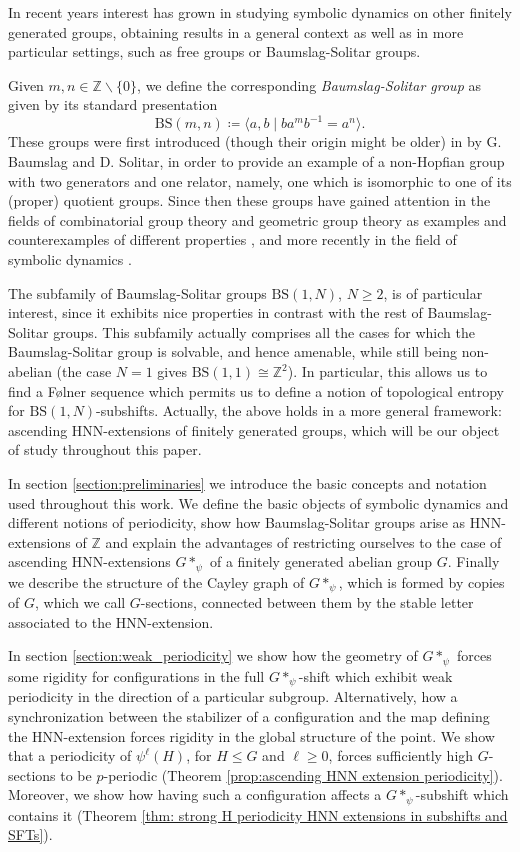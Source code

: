 \documentclass[letterpaper,11pt,reqno]{amsart}
\theoremstyle{plain}
\theoremstyle{definition}
\theoremstyle{cupremark}
\newcommand{\BS}[1][N]{\mathrm{BS}(1,#1)}
\begin{document}
In recent years interest has grown in studying symbolic dynamics on other finitely generated groups, obtaining results in a general context as well as in more particular settings, such as free groups or Baumslag-Solitar groups.

Given $m,n\in \mathbb{Z}\backslash \{0\}$, we define the corresponding \textit{Baumslag-Solitar group} as given by its standard presentation
$$
\mathrm{BS}(m,n)\coloneqq \langle a,b \mid ba^mb^{-1}=a^n \rangle.
$$
These groups were first introduced (though their origin might be older) in \cite{baumslag_solitar_1962} by G. Baumslag and D. Solitar, in order to provide an example of a non-Hopfian group with two generators and one relator, namely, one which is isomorphic to one of its (proper) quotient groups. Since then these groups have gained attention in the fields of combinatorial group theory and geometric group theory as examples and counterexamples of different properties \cite{harpe_2003,meskin_1972}, and more recently in the field of symbolic dynamics \cite{aubrun_kari_2013,cyr2016distortion,esnay2020weakly}.

The subfamily of Baumslag-Solitar groups $\BS$, $N\ge 2$, is of particular interest, since it exhibits nice properties in contrast with the rest of Baumslag-Solitar groups. This subfamily actually comprises all the cases for which the Baumslag-Solitar group is solvable, and hence amenable, while still being non-abelian (the case $N=1$ gives $\mathrm{BS}(1,1)\cong \mathbb{Z}^2$). In particular, this allows us to find a F\o lner sequence which permits us to define a notion of topological entropy for $\BS$-subshifts. Actually, the above holds in a more general framework: ascending HNN-extensions of finitely generated groups, which will be our object of study throughout this paper. 

In section \ref{section:preliminaries} we introduce the basic concepts and notation used throughout this work. We define the basic objects of symbolic dynamics and different notions of periodicity, show how Baumslag-Solitar groups arise as HNN-extensions of $\mathbb{Z}$ and explain the advantages of restricting ourselves to the case of ascending HNN-extensions $G*_{\psi}$ of a finitely generated abelian group $G$. Finally we describe the structure of the Cayley graph of $G*_{\psi}$, which is formed by copies of $G$, which we call $G$-sections, connected between them by the stable letter associated to the HNN-extension.

In section \ref{section:weak_periodicity} we show how the geometry of $G*_{\psi}$ forces some rigidity for configurations in the full $G*_{\psi}$-shift which exhibit weak periodicity in the direction of a particular subgroup. Alternatively, how a synchronization between the stabilizer of a configuration and the map defining the HNN-extension forces rigidity in the global structure of the point. We show that a periodicity of
$\psi^{\ell}(H)$, for $H\leqslant G$ and $\ell\ge 0$, forces sufficiently high $G$-sections to be $p$-periodic (Theorem \ref{prop:ascending HNN extension periodicity}). Moreover, we show how having such a configuration affects a $G*_{\psi}$-subshift which contains it (Theorem \ref{thm: strong H periodicity HNN extensions in subshifts and SFTs}).
\end{document}
